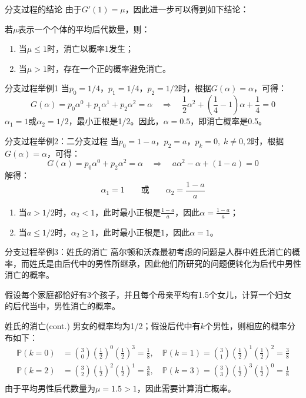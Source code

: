 \documentclass[t]{beamer}
\renewcommand{\Pr}{\mathbb{P}}
\begin{document}
\begin{frame}{分支过程的结论}
由于$G'(1)=\mu$，因此进一步可以得到如下结论：

若$\mu$表示一个个体的平均后代数量，则：
\begin{enumerate}
	\item 当$\mu\le 1$时，消亡以概率1发生；
	\item 当$\mu>1$时，存在一个正的概率避免消亡。
\end{enumerate}
\end{frame}


\begin{frame}{分支过程举例1}
    当$p_0=1/4$，$p_1=1/4$，$p_2=1/2$时，根据$G(\alpha)=\alpha$，可得：
	\[
G(\alpha)=p_0\alpha^0+p_1\alpha^1+p_2\alpha^2=\alpha \quad \Rightarrow\quad\frac{1}{2}\alpha^2+\left(\frac{1}{4}-1\right)\alpha+\frac{1}{4}=0
 \]
	$\alpha_1=1$或$\alpha_2=1/2$，最小正根是1/2。因此，$\alpha=0.5$，即消亡概率是0.5。
\end{frame}



\begin{frame}{分支过程举例2：二分支过程}
    当$p_0=1-a$，$p_2=a$，$p_k=0,\;k\ne 0,2$时，根据$G(\alpha)=\alpha$，可得：
    \[
    G(\alpha)=p_0\alpha^0+p_2\alpha^2=\alpha\quad \Rightarrow\quad 
        a\alpha^2-\alpha+(1-a)=0\]
    解得：$$\alpha_1=1\qquad \text{或}\qquad \alpha_2=\frac{1-a}{a}$$
    
    \begin{enumerate}
        \item 当$a>1/2$时，$\alpha_2<1$，此时最小正根是$\displaystyle\frac{1-a}{a}$，因此$\displaystyle\alpha=\frac{1-a}{a}$；
        \item 当$a\le 1/2$时，$\alpha_2\ge 1$，此时最小正根是$1$，因此$\alpha=1$。
    \end{enumerate}
\end{frame}


\begin{frame}{分支过程举例3：姓氏的消亡}
    高尔顿和沃森最初考虑的问题是人群中姓氏消亡的概率，而姓氏是由后代中的男性所继承，因此他们所研究的问题便转化为后代中男性消亡的概率。

    假设每个家庭都恰好有3个孩子，并且每个母亲平均有1.5个女儿，计算一个妇女
    的后代当中，男性消亡的概率。
\end{frame}


\begin{frame}{姓氏的消亡(cont.)}
    男女的概率均为1/2；假设后代中有$k$个男性，则相应的概率分布如下：
    \[\begin{split}
    \Pr(k=0)&={3\choose 0}\left(\frac{1}{2}\right)^0\left(\frac{1}{2}\right)^3=\frac{1}{8},\quad
    \Pr(k=1)={3\choose 1}\left(\frac{1}{2}\right)^1\left(\frac{1}{2}\right)^2=\frac{3}{8}\\
    \Pr(k=2)&={3\choose 2}\left(\frac{1}{2}\right)^2\left(\frac{1}{2}\right)^1=\frac{3}{8},\quad
    \Pr(k=3)={3\choose 3}\left(\frac{1}{2}\right)^3\left(\frac{1}{2}\right)^0=\frac{1}{8}\\
    \end{split} \]
    由于平均男性后代数量为$\mu=1.5>1$，因此需要计算消亡概率。
\end{frame}
\end{document}
